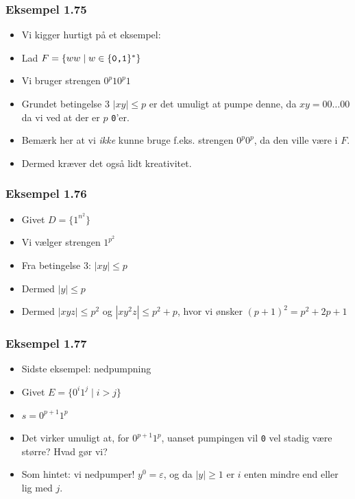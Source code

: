 \begin{frame}
  \frametitle{Eksempel 1.75}

  \begin{itemize}
	\item Vi kigger hurtigt på et eksempel:
	\item Lad $F = \{ww \mid w \in \{\text{\texttt{0,1}}\}^{*}\}$
	\item Vi bruger strengen $0^{p}10^{p}1$
	\item Grundet betingelse 3 $|xy| \le p$ er det umuligt at pumpe denne, da $xy = 00 \ldots 00$ da vi ved at der er $p$ \texttt{0}'er.
	\item Bemærk her at vi \textit{ikke} kunne bruge f.eks. strengen $0^{p}0^{p}$, da den ville være i $F$.
	\item Dermed kræver det også lidt kreativitet.
  \end{itemize}
\end{frame}

\begin{frame}
  \frametitle{Eksempel 1.76}
 \begin{itemize}
   \item Givet $D = \{1^{n^{2}}\}$
   \item Vi vælger strengen $1^{p^{2}}$
   \item Fra betingelse 3: $|xy| \le p$
   \item Dermed $|y| \le p$
   \item Dermed $|xyz| \le p^{2}$ og $|xy^{2}z| \le p^{2}+p$, hvor vi ønsker $(p+1)^{2} = p^{2} + 2p + 1$
 \end{itemize}
\end{frame}


\begin{frame}
  \frametitle{Eksempel 1.77}
 \begin{itemize}
   \item<1-> Sidste eksempel: nedpumpning
   \item<1-> Givet $E = \{0^{i}1^{j} \mid i > j\}$
   \item<1-> $s = 0^{p+1}1^{p}$
   \item<1-> Det virker umuligt at, for $0^{p+1}1^{p}$, uanset pumpingen vil \texttt{0} vel stadig være større? Hvad gør vi?
   \item<2> Som hintet: vi nedpumper! $y^{0} = \varepsilon$, og da $|y| \ge 1$ er $i$ enten mindre end eller lig med $j$.
 \end{itemize}
\end{frame}


